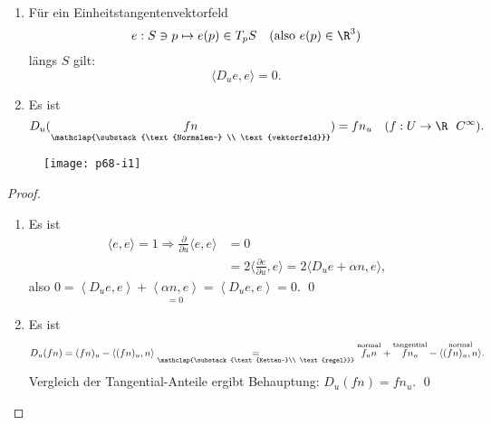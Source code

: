 \begin{lemma}
  \
  
  \begin{minipage}{.6\textwidth}
    \begin{enumerate}
      \item Für ein Einheitstangentenvektorfeld
      \begin{equation*}
        e: S \ni p \mapsto e(p) \in T_pS \quad (\text{also } e(p) \in \R^3)
      \end{equation*}
      längs $ S $ gilt:
      \begin{equation*}
        \langle D_ue, e \rangle = 0\text{.}
      \end{equation*}
  
      \item Es ist
      \begin{equation*}
        D_u(\underset{\mathclap{\substack{\text{Normalen-} \\ \text{vektorfeld}}}}{fn}) = fn_u \quad (f: U \to \R \ \ C^\infty)\text{.}
      \end{equation*}
    \end{enumerate}
  \end{minipage}
  \hfill
  \begin{minipage}{.375\textwidth}
    \begin{figure}[H]
      \texttt{[image: p68-i1]}
    \end{figure}
  \end{minipage}
  \begin{proof}
    \ 
    \begin{enumerate}
      \item Es ist
      \begin{align*}
        \langle e, e \rangle = 1 \Rightarrow \frac{\partial}{\partial u}\langle e, e \rangle &= 0 \\
          &= 2\langle \frac{\partial e}{\partial u}, e \rangle = 2\langle D_ue + \alpha n, e \rangle\text{,}
      \end{align*} 
      also $ 0 = \left\langle D_ue,e \right\rangle + \underset{=0}{\left\langle \alpha n, e \right\rangle} = \left\langle D_ue,e \right\rangle = 0 $. \qed

      \item Es ist
      \begin{equation*}
        D_u(fn) = (fn)_u - \left\langle (fn)_u, n \right\rangle \underset{\mathclap{\substack{\text{Ketten-}\\ \text{regel}}}}{=} \overset{\text{normal}}{f_un} + \overset{\text{tangential}}{fn_u} - \overset{\text{normal}}{\left\langle (fn)_u, n \right\rangle}\text{.}
      \end{equation*}
      Vergleich der Tangential-Anteile ergibt Behauptung: $ D_u(fn) = fn_u $. \qed
    \end{enumerate}
  \end{proof}
\end{lemma}

